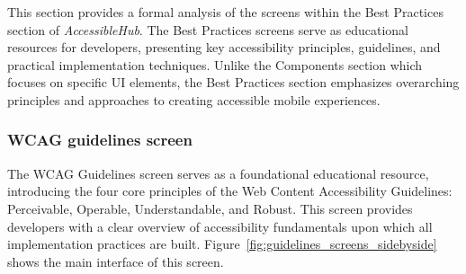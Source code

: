 This section provides a formal analysis of the screens within the Best Practices section of \textit{AccessibleHub}. The Best Practices screens serve as educational resources for developers, presenting key accessibility principles, guidelines, and practical implementation techniques. Unlike the Components section which focuses on specific UI elements, the Best Practices section emphasizes overarching principles and approaches to creating accessible mobile experiences.

\subsubsection{WCAG guidelines screen}
\label{subsubsec:guidelines-screen}

The WCAG Guidelines screen serves as a foundational educational resource, introducing the four core principles of the Web Content Accessibility Guidelines: Perceivable, Operable, Understandable, and Robust. This screen provides developers with a clear overview of accessibility fundamentals upon which all implementation practices are built. Figure~\ref{fig:guidelines_screens_sidebyside} shows the main interface of this screen.

\pagebreak

